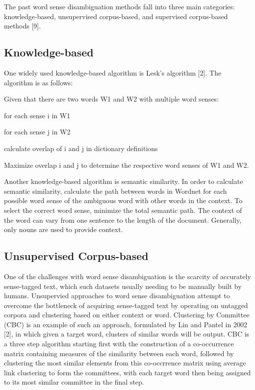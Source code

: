 \documentclass[10pt, letterpaper]{article}
\begin{document}
        The past word sense disambiguation methods fall into three main categories: knowledge-based, unsupervised corpus-based, and supervised corpus-based methods [9].

	\subsection{Knowledge-based}

        One widely used knowledge-based algorithm is Lesk's algorithm [2].  The algorithm is as follows: 

        Given that there are two words W1 and W2 with multiple word senses:

	for each sense i in W1

	\indent \indent for each sense j in W2

	\indent \indent \indent calculate overlap of i and j in dictionary definitions

	Maximize overlap i and j to determine the respective word senses of W1 and W2.
	
        Another knowledge-based algorithm is semantic similarity.  In order to calculate semantic similarity, calculate the path between words in Wordnet for each possible word sense of the ambiguous word with other words in the context.  To select the correct word sense, minimize the total semantic path.  The context of the word can vary from one sentence to the length of the document.  Generally, only nouns are used to provide context. 
	
	\subsection{Unsupervised Corpus-based}
	One of the challenges with word sense disambiguation is the scarcity of accurately sense-tagged text, which such datasets usually needing
	to be manually built by humans. Unsupervied approaches to word sense disambiguation attempt to overcome the bottleneck of acquiring sense-tagged
	text by operating on untagged corpora and clustering based on either context or word. Clustering by Committee (CBC) is an example of
	such an approach, formulated by Lin and Pantel in 2002 [2], in which given a target word, clusters of similar words will be output. CBC is a
	three step algorithm starting first with the construction of a co-occurrence matrix containing measures of the similarity between each word,
	followed by clustering the most similar elements from this co-occrrence matrix using average link clustering to form the committees, with each
	target word then being assigned to its most similar committee in the final step.
	
\end{document}
